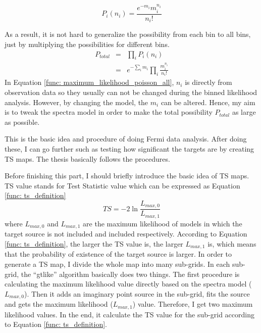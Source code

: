 \documentclass[12pt]{report}
\begin{document}
          \begin{equation}
            P_{i}\left(n_{i}\right) = \frac{e^{-m_{i}} m_{i}^{n_{i}}}{n_{i}!}
            \label{func: maximum_likelihood_poisson}
          \end{equation}

          As a result, it is not hard to generalize the possibility from each bin to all bins, 
          just by multiplying the possibilities for different bins.
          \begin{eqnarray}
            P_{total} &=& \prod_{i}^{}P_{i}\left(n_{i}\right) \nonumber \\ 
                      &=& e^{-\sum_{i}^{}m_i}\prod_{i}^{}\frac{m_{i}^{n_i}}{n_i!}
            \label{func: maximum_likelihood_poisson_all}
          \end{eqnarray}
          In Equation \ref{func: maximum_likelihood_poisson_all}, $n_i$ is directly 
          from observation data so they usually can not be changed during the binned likelihood 
          analysis. However, by changing the model, the $m_i$ can be altered. 
          Hence, my aim is to tweak the spectra model in order to make the total possibility 
          $P_{total}$ as large as possible. 

          This is the basic idea and procedure of doing Fermi data analysis. After doing these,
          I can go further such as testing how significant the targets are by creating TS 
          maps. The thesis basically follows the procedures. 

          Before finishing this part, I should briefly introduce the basic idea of TS maps. 
          TS value stands for Test Statistic value which can be expressed as Equation 
          \ref{func: ts_definition} 
          \begin{equation}
            TS = -2 \ln{\frac{L_{max,0}}{L_{max,1}}}
            \label{func: ts_definition}
          \end{equation}
          where $L_{max,0}$ and $L_{max,1}$ are the maximum likelihood of models in which the 
          target source is not included and included respectively. According to Equation 
          \ref{func: ts_definition}, the larger the TS value is, the larger $L_{max, 1}$ is, 
          which means that the probability of existence of the target source is larger. 
          In order to generate a TS map, I divide the whole map into many sub-grids. In each 
          sub-grid, the ``gtlike'' algorithm basically does two things. The first procedure is 
          calculating the maximum likelihood value directly based on the spectra model 
          ($L_{max,0}$). Then it adds an imaginary point source in the sub-grid, fits the source 
          and gets the maximum likelihood ($L_{max, 1}$) value. Therefore, I get two 
          maximum likelihood values. In the end, it calculate the TS value for the 
          sub-grid according to Equation \ref{func: ts_definition}. 
\end{document}
